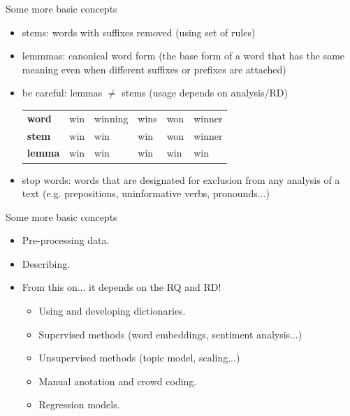 \documentclass{beamer}
\begin{document}
\begin{frame}{Some more basic concepts}
\begin{itemize}[<+->]
\item stems: words with suffixes removed (using set of rules)
\item lemmmas: canonical word form (the base form of a word that has the same meaning even when different suffixes or prefixes are attached)
\item be careful: lemmas $\neq$ stems (usage depends on analysis/RD)
\begin{table}[]
\begin{tabular}{llllll}
{\color[HTML]{6434FC} \textbf{word}}  & win & winning & wins & won & winner \\
{\color[HTML]{6434FC} \textbf{stem}}  & win & win     & win  & won & winner \\
{\color[HTML]{6434FC} \textbf{lemma}} & win & win     & win  & win & win   
\end{tabular}
\end{table}
\item stop words: words that are designated for exclusion from any analysis of a text (e.g. prepositions, uninformative verbs, pronounds...)
 \end{itemize} 
\end{frame}

\begin{frame}{Some more basic concepts}
\begin{itemize}[<+->]
\item Pre-processing data.
\item Describing.
\item From this on... it depends on the RQ and RD!
\begin{itemize}
   \item Using and developing dictionaries.
   \item Supervised methods (word embeddings, sentiment analysis...)
   \item Unsupervised methods (topic model, scaling...)
   \item Manual anotation and crowd coding.
   \item Regression models.
 \end{itemize}
 \end{itemize} 
\end{frame}


  \maketitle
\end{document}
